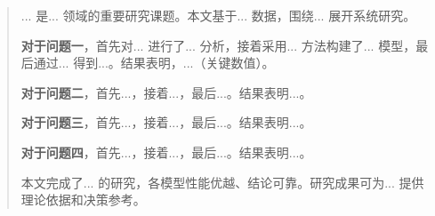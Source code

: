 \maketitle%
\begin{abstract}%

	... 是... 领域的重要研究课题。本文基于... 数据，围绕... 展开系统研究。

	\textbf{对于问题一}，首先对... 进行了... 分析，接着采用... 方法构建了... 模型，最后通过... 得到...。结果表明，...（关键数值）。

	\textbf{对于问题二}，首先...，接着...，最后...。结果表明...。

	\textbf{对于问题三}，首先...，接着...，最后...。结果表明...。

	\textbf{对于问题四}，首先...，接着...，最后...。结果表明...。

	本文完成了... 的研究，各模型性能优越、结论可靠。研究成果可为... 提供理论依据和决策参考。

\end{abstract}
